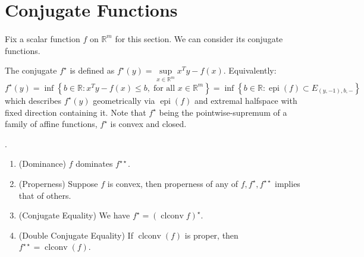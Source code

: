 \section{Conjugate Functions}
\label{sect:025}

\paragraph{}Fix a scalar function $f$ on $\mathbb{R}^m$ for this section. We can consider its conjugate functions.

\begin{defn}[Conjugate]\label{defn:025-conjugate}
	The conjugate $f^\star$ is defined as $f^\star(y)=\underset{x\in \mathbb{R}^m}{\operatorname{sup}}x^Ty-f(x)$. Equivalently:
	\[
		f^\star(y)=\inf\left\{b\in \mathbb{R}:x^Ty-f(x)\leq b,\;\text{for all }x\in \mathbb{R}^m\right\} =\inf\left\{b\in \mathbb{R}:\operatorname{epi}(f)\subset E_{(y,-1),b,-}\right\}
	\]
	which describes $f^\star(y)$ geometrically via $\operatorname{epi}(f)$ and extremal halfspace with fixed direction containing it.
	Note that $f^\star$ being the pointwise-supremum of a family of affine functions, $f^\star$ is convex and closed.
\end{defn}

\begin{prop}\label{prop:025-conjugacy-theorem}.
	\begin{enumerate}[label=(\alph*)]
		\item (Dominance) $f$ dominates $f^{\star\star}$.
		\item (Properness) Suppose $f$ is convex, then properness of any of $f,f^{\star},f^{\star\star}$ implies that of others.
		\item (Conjugate Equality) We have $f^\star=(\operatorname{clconv}f)^\star$.
		\item (Double Conjugate Equality) If $\operatorname{clconv}(f)$ is proper, then $f^{\star\star}=\operatorname{clconv}(f)$.
	\end{enumerate}
\end{prop}

